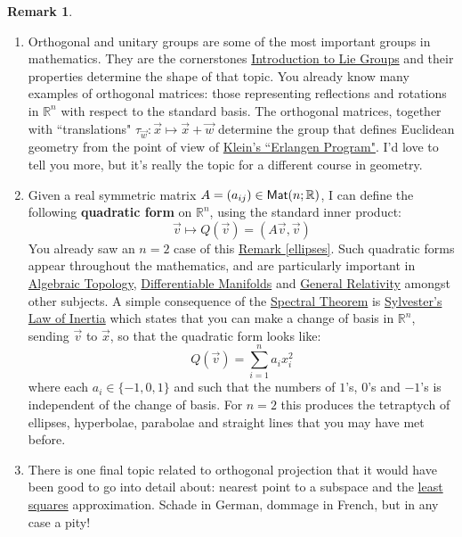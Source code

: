 \documentclass[11pt]{amsbook}
\theoremstyle{definition}
\newtheorem{rem}[theorem]{Remark}
\begin{document}
\begin{rem} \label{schade}
\begin{enumerate}
\item
Orthogonal and unitary groups are some of the most important groups in mathematics. They are the cornerstones \href{http://www.drps.ed.ac.uk/14-15/dpt/cxmath11053.htm}{Introduction to Lie Groups} and their properties determine the shape of that topic. You already know many examples of orthogonal matrices: those representing reflections and rotations in $\mathbb{R}^n$ with respect to the standard basis. The orthogonal matrices, together with ``translations" $\tau_{\vec{w}}: \vec{x} \mapsto \vec{x}+\vec{w}$ determine the group that defines Euclidean geometry from the point of view of \href{http://en.wikipedia.org/wiki/Erlangen_program}{Klein's ``Erlangen Program"}. I'd love to tell you more, but it's really the topic for a different course in geometry.
\item Given a real symmetric matrix $A= (a_{ij})\in {\sf Mat}(n; \mathbb{R})$, I can define the following {\bf quadratic form} on $\mathbb{R}^n$, using the standard inner product: $$\vec{v} \mapsto Q(\vec{v}) = (A\vec{v}, \vec{v})$$ You already saw an $n=2$ case of this \hyperref[ellipses]{Remark \ref{ellipses}}. Such quadratic forms appear throughout the mathematics, and are particularly important in \href{http://www.drps.ed.ac.uk/14-15/dpt/cxmath10027.htm}{Algebraic Topology}, \href{http://www.drps.ed.ac.uk/14-15/dpt/cxmath10088.htm}{Differentiable Manifolds} and \href{http://www.drps.ed.ac.uk/14-15/dpt/cxmath11138.htm}{General Relativity} amongst other subjects. A simple consequence of the \hyperref[spectral]{Spectral Theorem} is \href{http://en.wikipedia.org/wiki/Sylvester'27s_law_of_inertia}{Sylvester's Law of Inertia} which states that you can make a change of basis in $\mathbb{R}^n$, sending $\vec{v}$ to $\vec{x}$, so that the quadratic form looks like:
$$Q(\vec{v}) = \sum_{i=1}^n a_i x_i^2$$ where  each $a_i \in \{ -1,0,1\}$ and such that the numbers of $1$'s, $0$'s and $-1$'s is independent of the change of basis. For $n=2$ this produces the tetraptych of ellipses, hyperbolae, parabolae and straight lines that you may have met before.
\item There is one final topic related to orthogonal projection that it would have been good to go into detail about: nearest point to a subspace and the \href{http://en.wikipedia.org/wiki/Least_squares}{least squares} approximation. Schade in German, dommage in French, but in any case a pity!
\end{enumerate}
\end{rem}
\end{document}
